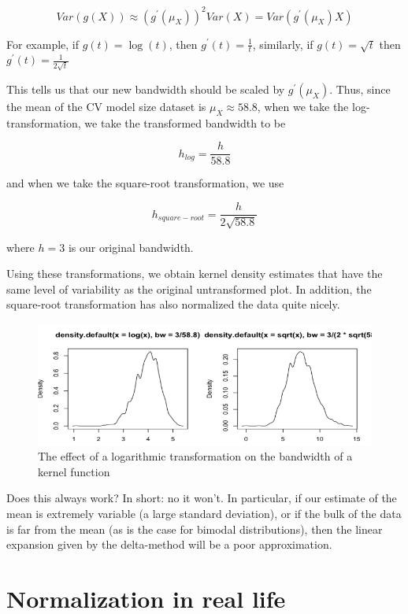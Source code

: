 $$Var(g(X)) \approx \left(g^\prime(\mu_X)\right)^2 Var(X) = Var(g^\prime(\mu_X) X)$$

For example, if $g(t) = \log (t)$, then $g^\prime(t) = \frac1t$, similarly, if $g(t) = \sqrt{t}$ then $g^\prime(t) = \frac{1}{2\sqrt{t}}$ 

This tells us that our new bandwidth should be scaled by $g^\prime(\mu_X)$. Thus, since the mean of the CV model size dataset is $\mu_X \approx 58.8$, when we take the log-transformation, we take the transformed bandwidth to be

$$h_{log} = \frac{h}{58.8}$$

and when we take the square-root transformation, we use

$$h_{square-root} = \frac{h}{2\sqrt{58.8}}$$

where $h=3$ is our original bandwidth.

Using these transformations, we obtain kernel density estimates that have the same level of variability as the original untransformed plot. In addition, the square-root transformation has also normalized the data quite nicely.

\begin{figure}[H]
\begin{center}
\includegraphics[scale=0.5]{log-transform-kernel2.png}
\end{center}
\caption{The effect of a logarithmic transformation on the bandwidth of a kernel function}
\label{fig:log_kernel2}
\end{figure}

Does this always work? In short: no it won't. In particular, if our estimate of the mean is extremely variable (a large standard deviation), or if the bulk of the data is far from the mean (as is the case for bimodal distributions), then the linear expansion given by the delta-method will be a poor approximation.



\section{Normalization in real life}

